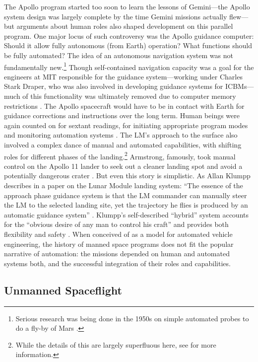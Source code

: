 The Apollo program started too soon to learn the lessons of
Gemini---the Apollo system design was largely complete by the time Gemini
missions actually flew---but arguments about human roles also shaped development on this
parallel program. One major locus of such controversy was the Apollo
guidance computer: Should it allow fully autonomous (from Earth)
operation? What functions should be fully automated? The idea of an
autonomous navigation system was not fundamentally new.\footnote{Serious
research was being done in the 1950s on simple automated probes to do a fly-by of
Mars \cite[p. 1]{battin}.} 
Though self-contained navigation capacity was a goal
for the engineers at MIT responsible for the guidance system---working
under Charles Stark Draper, who was also involved in developing
guidance systems for ICBMs---much of this functionality was ultimately
removed due to computer memory restrictions \cite{tindallMay12}. The Apollo
spacecraft would have to be in contact with Earth for guidance
corrections and instructions over the long term. Human beings were
again counted on for sextant readings, for initiating appropriate
program modes and monitoring automation systems \cite[p.
  4]{BennettExperience}. The LM's approach
to the surface also involved a complex dance of manual and automated
capabilities, with shifting roles for different phases of the
landing.\footnote{While the details of this are largely superfluous
  here, see \cite{BennettCheatham} for more information.}  Armstrong,
famously, took manual control on the Apollo 11 
lander to seek out a cleaner landing spot and avoid a potentially
dangerous crater \cite[p. 3]{DM}. But even this story is
simplistic. As Allan Klumpp describes in a
paper on the Lunar Module landing system: ``The essence of the
approach phase guidance system is that the LM commander can manually
steer the LM to the selected landing site, yet the trajectory he flies
is produced by an automatic guidance system'' \cite[p. 129]{Klumpp}.
Klumpp's self-described ``hybrid'' system accounts
for the ``obvious desire of any man to control his craft'' and
provides both flexibility and safety \cite[p. 129-130]{Klumpp}.
When conceived of as a model for automated vehicle
engineering, the history of manned space programs does not fit the
popular narrative of automation: the missions depended on human and
automated systems both, and the successful integration of their roles
and capabilities. 

\subsection{Unmanned Spaceflight}

